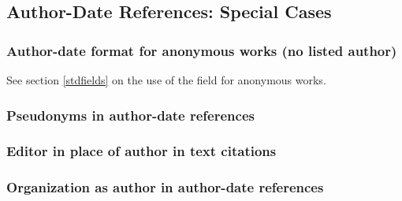 \documentclass[11pt,letterpaper,oneside]{article}
\begin{document}
\setcounter{subsection}{2}
\subsection{Author-Date References: Special Cases}
\setcounter{subsection}{15}

\setcounter{subsubsection}{33}
\subsubsection{Author-date format for anonymous works (no listed author)}
\label{15.34}

See section \ref{stdfields} on the use of the 
field for anonymous works.

\begin{citeref}
\item \parencite{anon1610}
\item \parencite{anon1547}
\item \parencite{horsley1796}
\item \parencite{hawkes1834}
\end{citeref}

\subsubsection{Pseudonyms in author-date references}

\begin{citeref}
\item \parencite{stendhal1925}
\end{citeref}

\subsubsection{Editor in place of author in text citations}

\begin{citeref}
\item \parencite{silverstein1974}
\item \parencite{soltes1999}
\end{citeref}

\subsubsection{Organization as author in author-date references}
\end{document}
